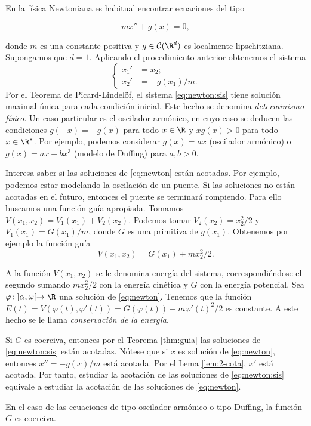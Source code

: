 \documentclass{article}
\begin{document}
\begin{ex}
  En la física Newtoniana es habitual encontrar ecuaciones del tipo
  
  \begin{equation}
    \label{eq:newton}
    m x'' + g(x) = 0,
  \end{equation}

  donde $m$ es una constante positiva y $g \in \mathcal{C}(\R^d)$ es localmente
  lipschitziana. Supongamos que $d = 1$. Aplicando el procedimiento anterior obtenemos el sistema
  \begin{equation}
    \label{eq:newton:sis}
    \begin{cases}
      x_1' & = x_2; \\
      x_2' & = - g(x_1) / m.
    \end{cases}
  \end{equation}
  Por el Teorema de Picard-Lindelöf, el sistema \eqref{eq:newton:sis} tiene solución maximal única
  para cada condición inicial. Este hecho se denomina \emph{determinismo físico}. Un caso particular
  es el oscilador armónico, en cuyo caso se deducen las condiciones $g(-x) = -g(x)$ para todo
  $x \in \R$ y $x g(x) > 0$ para todo $x \in \R^{*}$. Por ejemplo, podemos considerar $g(x) = ax$
  (oscilador armónico) o $g(x) = ax + bx^3$ (modelo de Duffing) para $a,b > 0$.

  Interesa saber si las soluciones de \eqref{eq:newton} están acotadas. Por ejemplo, podemos estar
  modelando la oscilación de un puente. Si las soluciones no están acotadas en el futuro, entonces
  el puente se terminará rompiendo. Para ello buscamos una función guía apropiada. Tomamos
  $V(x_1, x_2) = V_1(x_1)+V_2(x_2)$. Podemos tomar $V_2(x_2) = x_2^2 / 2$ y $V_1(x_1) = G(x_1) / m$,
  donde $G$ es una primitiva de $g(x_1)$. Obtenemos por ejemplo la función guía
  \[ V(x_1, x_2) = G(x_1) + m x_2^2 / 2. \]

  A la función $V(x_1, x_2)$ se le denomina energía del sistema, correspondiéndose el segundo
  sumando $m x_2^2 / 2$ con la energía cinética y $G$ con la energía potencial. Sea
  $\varphi\colon ]\alpha, \omega[ \to \R$ una solución de \eqref{eq:newton}. Tenemos que la función
  $E(t) = V(\varphi(t), \varphi'(t)) = G(\varphi(t)) + m \varphi'(t)^2/2$ es constante. A este hecho
  se le llama \emph{conservación de la energía}.

  Si $G$ es coerciva, entonces por el Teorema \ref{thm:guia} las soluciones de \eqref{eq:newton:sis}
  están acotadas. Nótese que si $x$ es solución de \eqref{eq:newton}, entonces $x'' = -g(x)/m$ está
  acotada. Por el Lema \ref{lem:2-cota}, $x'$ está acotada. Por tanto, estudiar la acotación de las
  soluciones de \eqref{eq:newton:sis} equivale a estudiar la acotación de las soluciones de
  \eqref{eq:newton}.
  
  En el caso de las ecuaciones de tipo oscilador armónico o tipo Duffing, la función $G$ es
  coerciva.
\end{ex}
\end{document}

